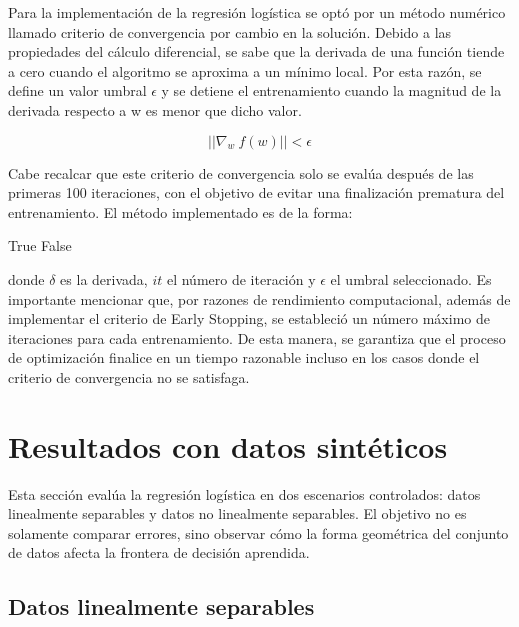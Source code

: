 \documentclass[12pt]{article}
\begin{document}
Para la implementación de la regresión logística se optó por un método numérico llamado criterio de convergencia por cambio en la solución. Debido a las propiedades del cálculo diferencial, se sabe que la derivada de una función tiende a cero cuando el algoritmo se aproxima a un mínimo local. Por esta razón, se define un valor umbral $\epsilon$ y se detiene el entrenamiento cuando la magnitud de la derivada respecto a w es menor que dicho valor.

\begin{equation}
|| \nabla_w \ f(w) || < \epsilon
\end{equation}

Cabe recalcar que este criterio de convergencia solo se evalúa después de las primeras 100 iteraciones, con el objetivo de evitar una finalización prematura del entrenamiento. El método implementado es de la forma:

\begin{algorithm}[H]
\caption{Criterio de convergencia}
\label{al::early_stop}
\begin{algorithmic}[1]
        \State \Return True
    \Else
        \State \Return False
    \EndIf
\EndFunction
\end{algorithmic}
\end{algorithm}

donde $\delta$ es la derivada, $it$ el número de iteración y $\epsilon$ el umbral seleccionado. Es importante mencionar que, por razones de rendimiento computacional, además de implementar el criterio de Early Stopping, se estableció un número máximo de iteraciones para cada entrenamiento. De esta manera, se garantiza que el proceso de optimización finalice en un tiempo razonable incluso en los casos donde el criterio de convergencia no se satisfaga.

\section{Resultados con datos sintéticos}

Esta sección evalúa la regresión logística en dos escenarios controlados: datos linealmente separables y datos no linealmente separables. El objetivo no es solamente comparar errores, sino observar cómo la forma geométrica del conjunto de datos afecta la frontera de decisión aprendida.

\subsection{Datos linealmente separables}
\end{document}
